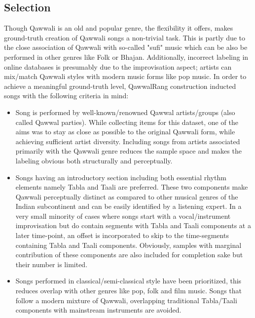 \documentclass{article}
\begin{document}
\subsection{Selection}
Though Qawwali is an old and popular genre, the flexibility it offers, makes ground-truth creation of Qawwali songs a non-trivial task. This is partly due to the close association of Qawwali with so-called "sufi" music\citep{qureshi1986sufi} which can be also be performed in other genres like Folk or Bhajan. Additionally, incorrect labeling in online databases is presumably due to the improvisation aspect; artists can mix/match Qawwali styles with modern music forms like pop music. In order to achieve a meaningful ground-truth level, QawwalRang construction inducted songs with the following criteria in mind:
\begin{itemize}
\item Song is performed by well-known/renowned Qawwal artists/groups (also called Qawwal parties). While collecting items for this dataset, one of the aims was to stay as close as possible to the original Qawwali form, while achieving sufficient artist diversity. Including songs from artists associated primarily with the Qawwali genre reduces the sample space and makes the labeling obvious both structurally and perceptually.
\item Songs having an introductory section including both essential rhythm elements namely Tabla and Taali are preferred. These two components make Qawwali perceptually distinct as compared to other musical genres of the Indian subcontinent and can be easily identified by a listening expert. In a very small minority of cases where songs start with a vocal/instrument improvisation but do contain segments with Tabla and Taali components at a later time-point, an offset is incorporated to skip to the time-segments containing Tabla and Taali components. Obviously, samples with marginal contribution of these components are also included for completion sake but their number is limited.
\item Songs performed in classical/semi-classical style have been prioritized, this reduces overlap with other genres like pop, folk and film music. Songs that follow a modern mixture of Qawwali, overlapping traditional Tabla/Taali components with mainstream instruments are avoided.
\end{itemize}
\end{document}
